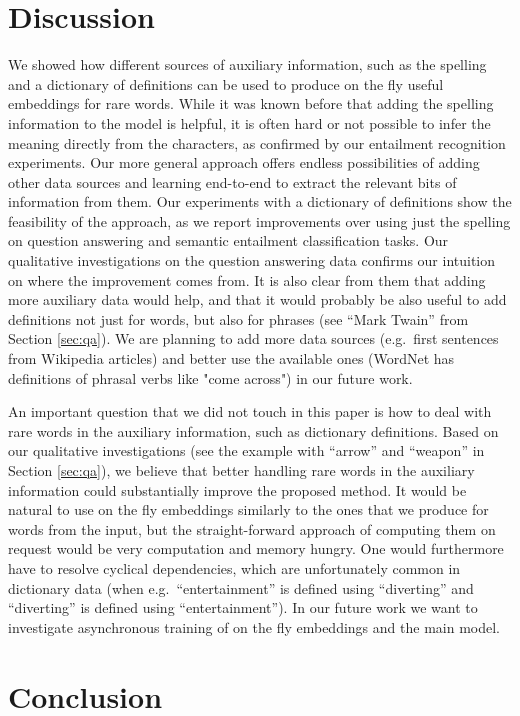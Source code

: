 \section{Discussion}
\label{sec:discussion}
We showed how different sources of auxiliary information, such as the spelling and a dictionary of definitions can be used to produce on the fly useful embeddings for rare words. While it was known before that adding the spelling information to the model is helpful, it is often hard or not possible to infer the meaning directly from the characters, as confirmed by our entailment recognition experiments. Our more general approach offers endless possibilities of adding other data sources and learning end-to-end to extract the relevant bits of information from them. Our experiments with a dictionary of definitions show the feasibility of the approach, as we report improvements over using just the spelling on question answering and semantic entailment classification tasks. Our qualitative investigations on the question answering data confirms our intuition on where the improvement comes from. It is also clear from them that adding more auxiliary data would help, and that it would probably be also useful to add definitions not just for words, but also for phrases (see ``Mark Twain'' from Section \ref{sec:qa}). We are planning to add more data sources (e.g.~first sentences from Wikipedia articles) and better use the available ones (WordNet has definitions of phrasal verbs like "come across") in our future work.

An important question that we did not touch in this paper is how to deal with rare words in the auxiliary information, such as dictionary definitions. Based on our qualitative investigations (see the example with ``arrow'' and ``weapon'' in Section \ref{sec:qa}), we believe that better handling rare words in the auxiliary information could substantially improve the proposed method. It would be natural to use on the fly embeddings similarly to the ones that we produce for words from the input, but the straight-forward approach of computing them on request would be very computation and memory hungry. One would furthermore have to resolve cyclical dependencies, which are unfortunately common in dictionary data (when e.g.~``entertainment'' is defined using ``diverting'' and ``diverting'' is defined using ``entertainment''). In our future work we want to investigate asynchronous training of on the fly embeddings and the main model. 

\section{Conclusion}
\label{sec:conclusion}

